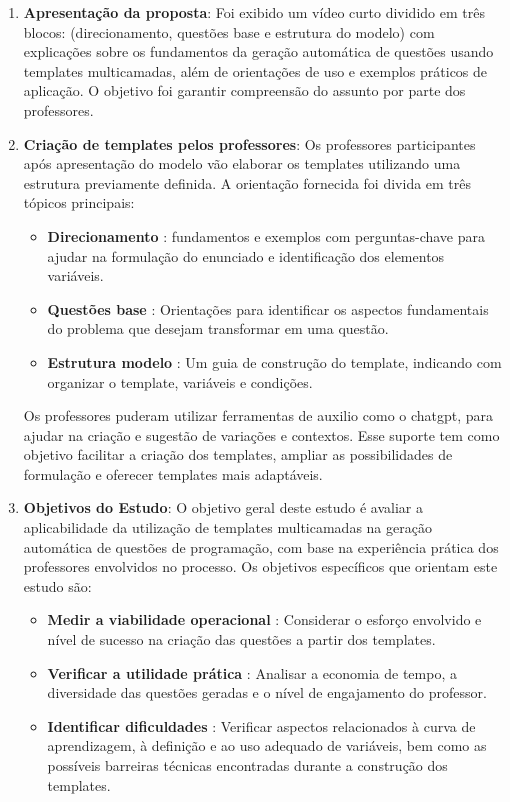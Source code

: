 \begin{enumerate}
    \item \textbf{Apresentação da proposta}:  Foi exibido um vídeo curto dividido em três blocos: (direcionamento, questões base e estrutura do modelo) com explicações sobre os fundamentos da geração automática de questões usando templates multicamadas, além de orientações de uso e exemplos práticos de aplicação. O objetivo foi garantir  compreensão do assunto por parte dos professores.
    
    \item \textbf{Criação de templates pelos professores}:  Os professores participantes após apresentação do modelo vão elaborar os templates utilizando uma estrutura previamente definida. A orientação fornecida foi divida em três tópicos principais:
    \begin{itemize}
        \item \textbf{Direcionamento} : fundamentos e exemplos com perguntas-chave para ajudar na formulação do enunciado e identificação dos elementos variáveis.
        \item \textbf{Questões base} : Orientações para identificar os aspectos fundamentais do problema que desejam transformar em uma questão.
        \item \textbf{Estrutura modelo} : Um guia de construção do template, indicando com organizar o template, variáveis e condições.
    \end{itemize}

Os professores puderam utilizar ferramentas de auxilio como o \gls{chatgpt}, para ajudar na criação e sugestão de variações e contextos. Esse suporte tem como objetivo facilitar a criação dos templates, ampliar as possibilidades de formulação e oferecer templates mais adaptáveis.

    \item \textbf{Objetivos do Estudo}:  O objetivo geral deste estudo é avaliar a aplicabilidade da utilização de templates multicamadas na geração automática de questões de programação, com base na experiência prática dos professores envolvidos no processo. Os objetivos específicos que orientam este estudo são:

       \begin{itemize}
        \item \textbf{Medir a viabilidade operacional} : Considerar  o esforço envolvido e nível de sucesso na criação das questões a partir dos templates.
        \item \textbf{Verificar a utilidade prática} : Analisar a economia de tempo, a diversidade das questões geradas e o nível de engajamento do professor.
        \item \textbf{Identificar dificuldades} : Verificar aspectos relacionados à curva de aprendizagem, à definição e ao uso adequado de variáveis, bem como as possíveis barreiras técnicas encontradas durante a construção dos templates. 
    \end{itemize}
   

\end{enumerate}
